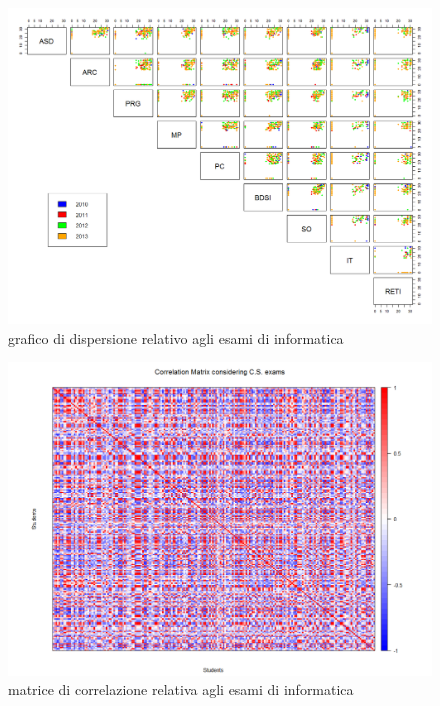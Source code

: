                 \begin{figure}
                    \centering
                    \caption{grafico di dispersione relativo agli esami di informatica}
                    \label{esami_inf}
                	\includegraphics[scale=0.32]{img/scatter_plot_7_gen.png}
                \end{figure}

                \begin{figure}
                    \centering
                    \caption{matrice di correlazione relativa agli esami di informatica}
                    \label{esami_inf_corr}
                	\includegraphics[scale=0.32]{img/corr_matrix_2.png}
                \end{figure}

